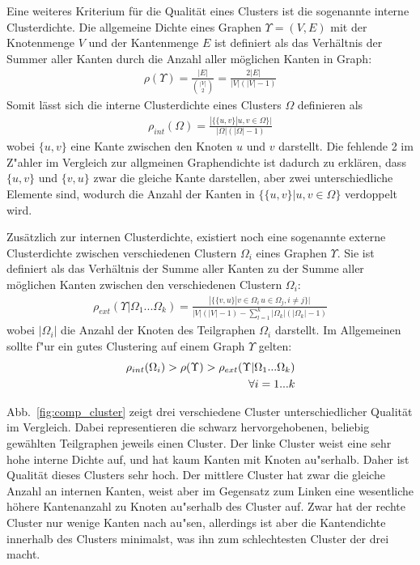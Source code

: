 \documentclass[journal]{vgtc}
\begin{document}
  Eine weiteres Kriterium für die Qualität eines Clusters ist die sogenannte interne Clusterdichte.
  Die allgemeine Dichte eines Graphen $\Upsilon = (V,E)$ mit der Knotenmenge $V$ und der Kantenmenge
  $E$ ist definiert als das Verhältnis der Summer aller Kanten durch die Anzahl aller 
  möglichen Kanten in Graph:
    \begin{align}
      \rho(\Upsilon) = \frac{|E|}{\binom{|V|}{2}} = \frac{2|E|}{|V|(|V|-1)}
    \end{align}
  Somit lässt sich die interne Clusterdichte eines Clusters $\Omega$ definieren als
    \begin{align}
      \rho_{int}(\Omega) = \frac{|\{\{u,v\} |u,v \in \Omega \}|}{|\Omega|(|\Omega|-1)}
    \end{align}
  wobei $\{u,v\}$ eine Kante zwischen den Knoten $u$ und $v$ darstellt. Die fehlende 2 im Z"ahler
  im Vergleich zur allgmeinen Graphendichte ist dadurch zu erklären, dass $\{u,v\}$ und $\{v,u\}$ 
  zwar die gleiche Kante darstellen, aber zwei unterschiedliche Elemente sind, wodurch die Anzahl
  der Kanten in $\{\{u,v\} |u,v \in \Omega \}$ verdoppelt wird.
  
  Zusätzlich zur internen Clusterdichte, existiert noch eine sogenannte externe Clusterdichte 
  zwischen verschiedenen Clustern $\Omega_i$ eines Graphen $\Upsilon$. Sie ist definiert als
  das Verhältnis der Summe aller Kanten zu der Summe aller möglichen Kanten zwischen den
  verschiedenen Clustern $\Omega_i$:
    \begin{align}
      \rho_{ext}(\Upsilon|\Omega_1 ... \Omega_k) = \frac{|\{\{v,u\} | v\in \Omega_i\, u \in \Omega_j, i \neq j\}|}
                                                        {|V|(|V|-1)-\sum\limits_{l=1}^k |\Omega_k|(|\Omega_k|-1)}
    \end{align}
  wobei $|\Omega_i|$ die Anzahl der Knoten des Teilgraphen $\Omega_i$ darstellt.
  Im Allgemeinen sollte f"ur ein gutes Clustering auf einem Graph $\Upsilon$ gelten:
    \begin{align}
      \rho_{int}(\Omega_i) > \rho(\Upsilon) > \rho_{ext}(\Upsilon|\Omega_1 ... \Omega_k) \\ 
      			\forall i=1...k \notag
    \end{align}
  
  Abb.~\ref{fig:comp_cluster} zeigt drei verschiedene Cluster unterschiedlicher Qualität im Vergleich.
  Dabei representieren die schwarz hervorgehobenen, beliebig gewählten Teilgraphen jeweils 
  einen Cluster. Der linke Cluster weist eine sehr hohe interne
  Dichte auf, und hat kaum Kanten mit Knoten au"serhalb. Daher ist Qualität dieses Clusters
  sehr hoch. Der mittlere Cluster hat zwar die gleiche Anzahl an internen Kanten, weist
  aber im Gegensatz zum Linken eine wesentliche höhere Kantenanzahl zu Knoten au"serhalb des
  Cluster auf. Zwar hat der rechte Cluster nur wenige Kanten nach au"sen, allerdings ist aber
  die Kantendichte innerhalb des Clusters minimalst, was ihn zum schlechtesten Cluster der drei macht.
\end{document}

